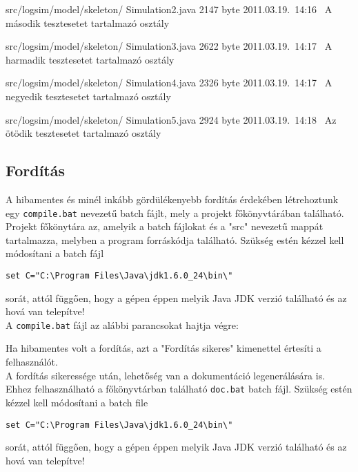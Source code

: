 \begin{fajllista}
\fajl
{src/logsim/model/skeleton/\newline
Simulation2.java} %
{2147 byte} %
{2011.03.19.~14:16~} %
{A második tesztesetet tartalmazó osztály} %

\fajl
{src/logsim/model/skeleton/\newline
Simulation3.java} %
{2622 byte} %
{2011.03.19.~14:17~} %
{A harmadik tesztesetet tartalmazó osztály} %

\fajl
{src/logsim/model/skeleton/\newline
Simulation4.java} %
{2326 byte} %
{2011.03.19.~14:17~} %
{A negyedik tesztesetet tartalmazó osztály} %

\fajl
{src/logsim/model/skeleton/\newline
Simulation5.java} %
{2924 byte} %
{2011.03.19.~14:18~} %
{Az ötödik tesztesetet tartalmazó osztály} %

\end{fajllista}

\subsection{Fordítás}
A hibamentes és minél inkább gördülékenyebb fordítás érdekében létrehoztunk egy \texttt{compile.bat} nevezetű batch fájlt, mely a projekt főkönyvtárában található. Projekt főkönytára az, amelyik a batch fájlokat és a "src" nevezetű mappát tartalmazza, melyben a program forráskódja található. Szükség estén kézzel kell módosítani a batch fájl
\begin{verbatim}
set C="C:\Program Files\Java\jdk1.6.0_24\bin\" 
\end{verbatim}
sorát, attól függően, hogy a gépen éppen melyik Java JDK verzió található és az hová van telepítve!\\

A \texttt{compile.bat} fájl az alábbi parancsokat hajtja végre:

Ha hibamentes volt a fordítás, azt a "Fordítás sikeres" kimenettel értesíti a felhasználót.\\

A fordítás sikeressége után, lehetőség van a dokumentáció legenerálására is. Ehhez felhasználható a főkönyvtárban található \texttt{doc.bat} batch fájl.
Szükség estén kézzel kell módosítani a batch file \begin{verbatim}
set C="C:\Program Files\Java\jdk1.6.0_24\bin\" 
\end{verbatim}
sorát, attól függően, hogy a gépen éppen melyik Java JDK verzió található és az hová van telepítve!\\

